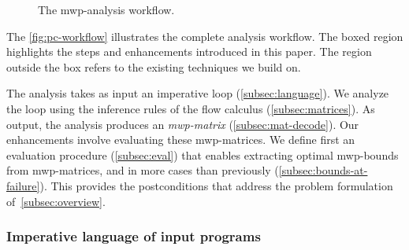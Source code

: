 \begin{figure}[H]
\centering
{}

\caption[The mwp-analysis workflow]{The mwp-analysis workflow.}
\label{fig:pc-workflow}
\end{figure}

The \autoref{fig:pc-workflow} illustrates the complete analysis workflow.
The boxed region highlights the steps and enhancements introduced in this paper.
The region outside the box refers to the existing techniques we build on.

The analysis takes as input an imperative loop (\autoref{subsec:language}).
We analyze the loop using the inference rules of the flow calculus (\autoref{subsec:matrices}).
As output, the analysis produces an \emph{mwp-matrix} (\autoref{subsec:mat-decode}).
Our enhancements involve {evaluating} these mwp-matrices.
We define first an {evaluation procedure} (\autoref{subsec:eval}) that enables extracting optimal mwp-bounds from mwp-matrices,
and in more cases than previously (\autoref{subsec:bounds-at-failure}).
This provides the postconditions that address the problem formulation of~\autoref{subsec:overview}.

\subsubsection{Imperative language of input programs}
\label{subsec:language}

